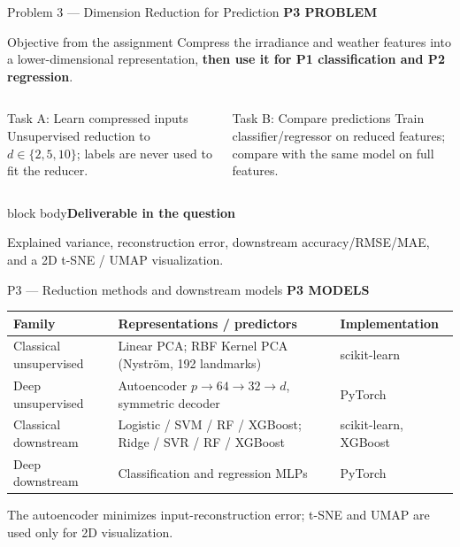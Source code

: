\documentclass[aspectratio=169,11pt]{beamer}
\newcommand{\sectiontag}[1]{{\footnotesize\usebeamercolor[fg]{structure}\textbf{#1}}\par\vspace{0.10cm}}
\newcommand{\smallmuted}[1]{{\footnotesize\color{slate}#1\par}}
\newcommand{\factbox}[2]{\begin{beamercolorbox}[sep=0.13cm,wd=\linewidth]{block body}{\bfseries #1}\par\small #2\end{beamercolorbox}}
\begin{document}
\begin{frame}{Problem 3 — Dimension Reduction for Prediction}
\sectiontag{P3 \quad PROBLEM}
\begin{block}{Objective from the assignment}
Compress the irradiance and weather features into a lower-dimensional representation, \textbf{then use it for P1 classification and P2 regression}.
\end{block}
\begin{columns}[T,totalwidth=\textwidth]
\begin{column}{0.49\textwidth}
\begin{block}{Task A: Learn compressed inputs}
Unsupervised reduction to $d\in\{2,5,10\}$; labels are never used to fit the reducer.
\end{block}
\end{column}
\begin{column}{0.49\textwidth}
\begin{block}{Task B: Compare predictions}
Train classifier/regressor on reduced features; compare with the same model on full features.
\end{block}
\end{column}
\end{columns}
\vspace{0.10cm}
\factbox{Deliverable in the question}{Explained variance, reconstruction error, downstream accuracy/RMSE/MAE, and a 2D t-SNE / UMAP visualization.}
\end{frame}

\begin{frame}{P3 — Reduction methods and downstream models}
\sectiontag{P3 \quad MODELS}
\renewcommand{\arraystretch}{1.34}
\begin{tabularx}{\linewidth}{@{}P{2.2cm}YP{3.15cm}@{}}\toprule
\textbf{Family} & \textbf{Representations / predictors} & \textbf{Implementation}\\\midrule
{} Classical unsupervised & Linear PCA; RBF Kernel PCA (Nystr\"om, 192 landmarks) & scikit-learn\\
 Deep unsupervised & Autoencoder $p\to64\to32\to d$, symmetric decoder & PyTorch\\
 Classical downstream & Logistic / SVM / RF / XGBoost; Ridge / SVR / RF / XGBoost & scikit-learn, XGBoost\\
 Deep downstream & Classification and regression MLPs & PyTorch\\\bottomrule
\end{tabularx}\par
\vspace{0.18cm}
\smallmuted{The autoencoder minimizes input-reconstruction error; t-SNE and UMAP are used only for 2D visualization.}
\end{frame}
\end{document}
